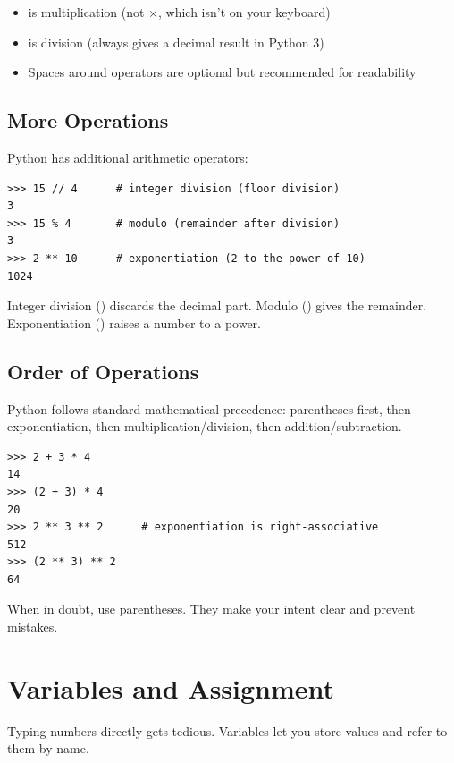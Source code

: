 \begin{itemize}
    \item \py{*} is multiplication (not $\times$, which isn't on your keyboard)
    \item \py{/} is division (always gives a decimal result in Python 3)
    \item Spaces around operators are optional but recommended for readability
\end{itemize}

\subsection{More Operations}

Python has additional arithmetic operators:

\begin{lstlisting}
>>> 15 // 4      # integer division (floor division)
3
>>> 15 % 4       # modulo (remainder after division)
3
>>> 2 ** 10      # exponentiation (2 to the power of 10)
1024
\end{lstlisting}

Integer division (\py{//}) discards the decimal part. Modulo (\py{\%}) gives the remainder. Exponentiation (\py{**}) raises a number to a power.

\subsection{Order of Operations}

Python follows standard mathematical precedence: parentheses first, then exponentiation, then multiplication/division, then addition/subtraction.

\begin{lstlisting}
>>> 2 + 3 * 4
14
>>> (2 + 3) * 4
20
>>> 2 ** 3 ** 2      # exponentiation is right-associative
512
>>> (2 ** 3) ** 2
64
\end{lstlisting}

When in doubt, use parentheses. They make your intent clear and prevent mistakes.

\section{Variables and Assignment}
\label{sec:variables}

Typing numbers directly gets tedious. Variables let you store values and refer to them by name.

